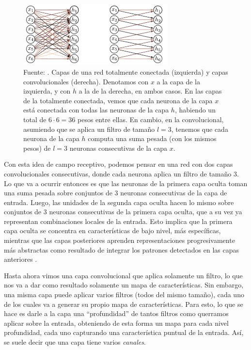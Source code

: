 \documentclass[../../main.tex]{subfiles}
\begin{document}
\begin{figure}
    \centering
    \includegraphics[width=0.7\textwidth]{figs/fully-connected-vs-conv.png}
    \caption{Fuente: \cite{prince2024understanding}. Capas de una red totalmente conectada
    (izquierda) y capas convolucionales (derecha). Denotamos con \(x\) a la capa de la
    izquierda, y con \(h\) a la de la derecha, en ambos casos. En las capas de la totalmente
    conectada, vemos que cada neurona de la capa \(x\) está conectada con todas las
    neuronas de la capa \(h\), habiendo un total de \(6 \cdot 6 = 36\) pesos entre ellas.
    En cambio, en la convolucional, asumiendo que se aplica un filtro de tamaño \(l=3\),
    tenemos que cada neurona de la capa \(h\) computa una suma pesada (con los mismos
    pesos) de \(l=3\) neuronas consecutivas de la capa \(x\).}
    \label{fig:fully-connected-vs-conv}
\end{figure}

Con esta idea de campo receptivo, podemos pensar en una red con dos capas convolucionales
consecutivas, donde cada neurona aplica un filtro de tamaño 3. Lo que va a ocurrir
entonces es que las neuronas de la primera capa oculta toman una suma pesada sobre
conjuntos de 3 neuronas consecutivas de la capa de entrada. Luego, las unidades de la
segunda capa oculta hacen lo mismo sobre conjuntos de 3 neuronas consecutivas de la
primera capa oculta, que a su vez ya representan combinaciones locales de la entrada. Esto
implica que la primera capa oculta se concentra en características de bajo nivel, más
específicas, mientras que las capas posteriores aprenden representaciones progresivamente
más abstractas como resultado de integrar los patrones detectados en las capas anteriores
\cite{hands-on-ML-sklearn-tf}.

Hasta ahora vimos una capa convolucional que aplica solamente un filtro, lo que nos va a
dar como resultado solamente un mapa de características. Sin embargo, una misma capa puede
aplicar varios filtros (todos del mismo tamaño), cada uno de los cuales va a generar su
propio mapa de características. Para esto, lo que se hace es darle a la capa una
``profundidad'' de tantos filtros como querramos aplicar sobre la entrada, obteniendo de
esta forma un mapa para cada nivel profundidad, cada uno capturando una característica
puntual de la entrada. Así, se suele decir que una capa tiene varios \textit{canales}.
\end{document}
